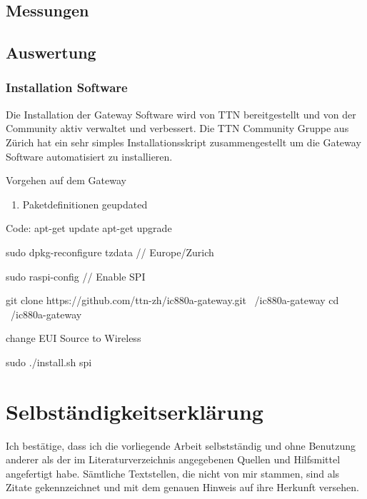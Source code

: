 \documentclass[11pt,english,german]{report}
\theoremstyle{definition}
\begin{document}
\section{Messungen}

\section{Auswertung}


\subsection{Installation Software}
Die Installation der Gateway Software wird von TTN bereitgestellt und von der Community aktiv verwaltet und verbessert. Die TTN Community Gruppe aus Zürich hat ein sehr simples Installationsskript zusammengestellt um die Gateway Software automatisiert zu installieren.

Vorgehen auf dem Gateway
\begin{enumerate}
	\item Paketdefinitionen geupdated
	
\end{enumerate}
Code:
apt-get update
apt-get upgrade

sudo dpkg-reconfigure tzdata // Europe/Zurich

sudo raspi-config // Enable SPI

git clone https://github.com/ttn-zh/ic880a-gateway.git ~/ic880a-gateway
cd ~/ic880a-gateway

change EUI Source to Wireless

sudo ./install.sh spi



\chapter*{Selbständigkeitserklärung}
\label{chap:selbstaendigkeitserklaerung}

\vspace*{10mm} 

Ich bestätige, dass ich die vorliegende Arbeit selbstständig und ohne Benutzung anderer als der im Literaturverzeichnis angegebenen Quellen und Hilfsmittel angefertigt habe. Sämtliche Textstellen, die nicht von mir stammen, sind als Zitate gekennzeichnet und mit dem genauen Hinweis auf ihre Herkunft versehen. 

\vspace{15mm}
\end{document}

